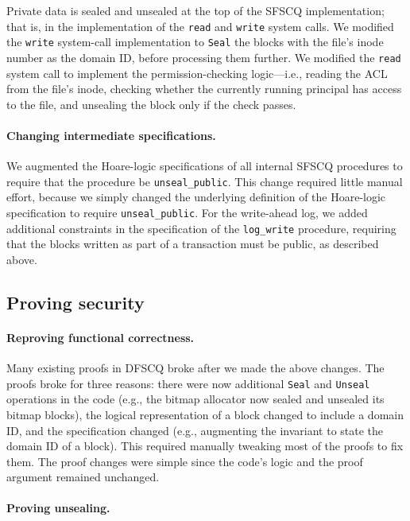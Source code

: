 Private data is sealed and unsealed at the top of the SFSCQ
implementation; that is, in the implementation of the \texttt{read}
and \texttt{write} system calls.  We modified the \texttt{write} system-call
implementation to \texttt{Seal} the blocks with the file's inode number
as the domain ID, before processing them further.
We modified the \texttt{read} system call to implement the
permission-checking logic---i.e., reading the ACL from the file's inode,
checking whether the currently running principal has access to the file,
and unsealing the block only if the check passes.


\paragraph{Changing intermediate specifications.}

We augmented the Hoare-logic specifications of all internal SFSCQ
procedures to require that the procedure be \texttt{unseal\_public}.
This change required little manual effort, because we simply changed
the underlying definition of the Hoare-logic specification to require
\texttt{unseal\_public}.  For the write-ahead log, we added additional
constraints in the specification of the \texttt{log\_write} procedure,
requiring that the blocks written as part of a transaction must be public,
as described above.


\subsection{Proving security}


\paragraph{Reproving functional correctness.}

Many existing proofs in DFSCQ broke after we made the above changes.  The proofs
broke for three reasons: there were now additional \texttt{Seal} and \texttt{Unseal}
operations in the code (e.g., the bitmap allocator now sealed and unsealed its
bitmap blocks), the logical representation of a block changed to include a
domain ID, and the specification changed (e.g., augmenting the invariant to
state the domain ID of a block).  This required manually tweaking most of the
proofs to fix them.  The proof changes were simple since the code's logic and
the proof argument remained unchanged.


\paragraph{Proving unsealing.}

